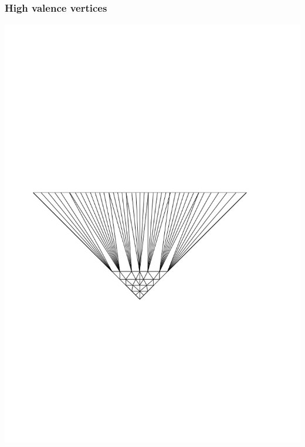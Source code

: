 \documentclass[14pt]{beamer}
\begin{document}
\begin{frame}
\frametitle{High valence vertices}
\begin{center}
\includegraphics[scale=0.6, trim = 0 0 0 300]{HV_4.png}
\end{center}
\end{frame}
\end{document}
